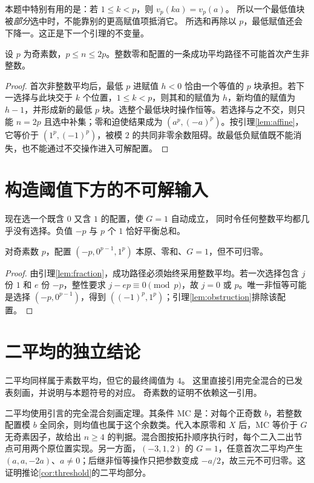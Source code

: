 本题中特别有用的是：若 $1\le k<p$，则 $v_p(ka)=v_p(a)$。
所以一个最低值块被\emph{部分}选中时，不能靠别的更高赋值项抵消它。
所选和再除以 $p$，最低赋值还会下降一。这正是下一个引理的不变量。

\begin{lemma}[小维数中首次分数化不可挽回]\label{lem:fraction}
设 $p$ 为奇素数，$p\le n\le2p$。整数零和配置的一条成功平均路径不可能首次产生非整数。
\end{lemma}
\begin{proof}
首次非整数平均后，最低 $p$ 进赋值 $h<0$ 恰由一个等值的 $p$ 块承担。若下一选择与此块交于 $k$ 个位置，$1\le k<p$，则其和的赋值为 $h$，新均值的赋值为 $h-1$，并形成新的最低 $p$ 块。选整个最低块时操作恒等。若选择与之不交，则只能 $n=2p$ 且选中补集；零和迫使结果成为 $(a^p,(-a)^p)$。按引理\ref{lem:affine}，它等价于 $(1^p,(-1)^p)$，被模 $2$ 的共同非零余数阻碍。故最低负赋值既不能消失，也不能通过不交操作进入可解配置。
\end{proof}


\section{构造阈值下方的不可解输入}
现在选一个既含 $0$ 又含 $1$ 的配置，使 $G=1$ 自动成立，
同时令任何整数平均都几乎没有选择。负值 $-p$ 与 $p$ 个 $1$ 恰好平衡总和。

\begin{proposition}[位于2p的反例]\label{prop:lower}
对奇素数 $p$，配置 $(-p,0^{p-1},1^p)$ 本原、零和、$G=1$，但不可归零。
\end{proposition}
\begin{proof}
由引理\ref{lem:fraction}，成功路径必须始终采用整数平均。若一次选择包含 $j$ 份 $1$ 和 $e$ 份 $-p$，整性要求 $j-ep\equiv0\pmod p$，故 $j=0$ 或 $p$。唯一非恒等可能是选择 $(-p,0^{p-1})$，得到 $((-1)^p,1^p)$；引理\ref{lem:obstruction}排除该配置。
\end{proof}


\section{二平均的独立结论}
二平均同样属于素数平均，但它的最终阈值为 $4$。
这里直接引用完全混合的已发表刻画，并说明与本题符号的对应。
奇素数的证明不依赖这一引用。

二平均使用\cite{mixing}引言的完全混合刻画定理。其条件 MC 是：对每个正奇数 $b$，若整数配置模 $b$ 全同余，则均值也属于这个余数类。代入本原零和 $X$ 后，MC 等价于 $G$ 无奇素因子，故给出 $n\ge4$ 的判据。混合图按拓扑顺序执行时，每个二入二出节点可用两个原位置实现。另一方面，$(-3,1,2)$ 的 $G=1$，任意首次二平均产生 $(a,a,-2a)$、$a\ne0$；后继非恒等操作只把参数变成 $-a/2$，故三元不可归零。这证明推论\ref{cor:threshold}的二平均部分。

